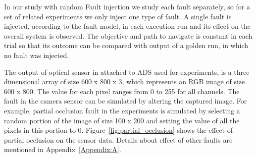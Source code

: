  In our study with random Fault injection we study each fault separately, so for a set of related experiments we only inject one type of fault. A single fault is injected, according to the fault model, in each execution run and its effect on the overall system is observed. The objective and path to navigate is constant in each trial so that its outcome can be compared with output of a golden run, in which no fault was injected. 
 
 The output of optical sensor in attached to ADS used for experiments, is a three dimensional array of size 600 x 800 x 3, which represents an RGB image of size 600 x 800. The value for each pixel ranges from 0 to 255 for all channels. The fault in the camera sensor can be simulated by altering the captured image. For example, partial occlusion fault in the experiments is simulated by selecting a random portion of the image of size 100 x 200 and setting the value of all the pixels in this portion to 0. Figure~\ref{fig:partial_occlusion} shows the effect of partial occlusion on the sensor data. Details about effect of other faults are mentioned in Appendix~\ref{Appendix:A}.
 

